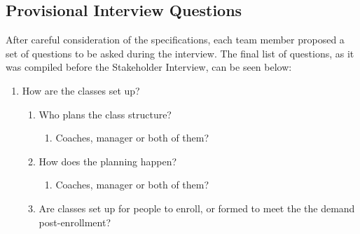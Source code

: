 \documentclass{l3proj}
\begin{document}
\subsection{Provisional Interview Questions}
\par

After careful consideration of the specifications, each team member proposed a set of questions to be asked during the interview. The final list of questions, as it was compiled before the Stakeholder Interview, can be seen below:
\begin{enumerate}
\item How are the classes set up?
		\begin{enumerate}
	\item Who plans the class structure?
			\begin{enumerate}
		\item Coaches, manager or both of them?
			\end{enumerate}
	\item How does the planning happen?
			\begin{enumerate}
		\item Coaches, manager or both of them?
			\end{enumerate}
	\item Are classes set up for people to enroll, or formed to meet the the demand post-enrollment?
\end{enumerate}


\end{enumerate}
\end{document}
